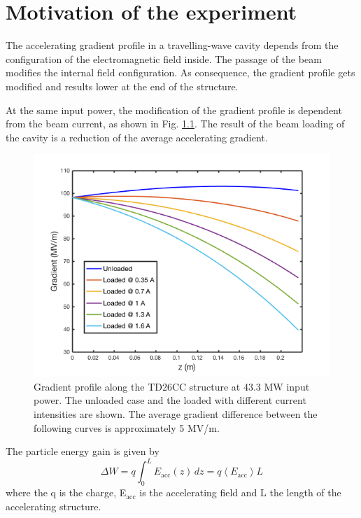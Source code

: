\chapter[Motivation of the experiment]{Motivation of the experiment}

The accelerating gradient profile in a travelling-wave cavity depends from the configuration of the electromagnetic field inside. The passage of the  beam modifies the internal field configuration. As consequence, the gradient profile gets modified and results lower at the end of the structure.

At the same input power, the modification of the gradient profile is dependent from the beam current, as shown in Fig. \ref{grad_vs_I}. The result of the beam loading of the cavity is a reduction of the average accelerating gradient.

\begin{figure}[h]
\centering 
\includegraphics[scale=0.5]{pictures/Gradient_vs_current.png}
\caption{Gradient profile along the TD26CC structure at 43.3 MW input power. The unloaded case and the loaded with different current intensities are shown. The average gradient difference between the following curves is approximately 5 MV/m.}
\label{grad_vs_I}
\end{figure}

\noindent
The particle energy gain is given by 
\begin{equation}
\Delta W  = q \int_0^L E_{\text{acc}} (z) \, dz = q \left \langle E_{\text{acc}} \right \rangle L
\label{en_gain}
\end{equation}
where the q is the charge, E$_{\text{acc}}$ is the accelerating field and L the length of the accelerating structure.

